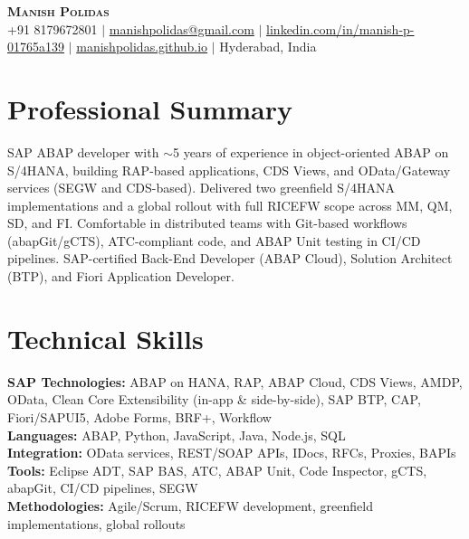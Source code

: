 \documentclass[letterpaper,11pt]{article}
\begin{document}
\begin{center}
    \textbf{\Huge \scshape Manish Polidas} \\ \vspace{1pt}
    \small +91 8179672801 $|$ \href{mailto:manishpolidas@gmail.com}{manishpolidas@gmail.com} $|$
    \href{https://www.linkedin.com/in/manish-p-01765a139/}{linkedin.com/in/manish-p-01765a139} $|$
    \href{https://manishpolidas.github.io}{manishpolidas.github.io} $|$ Hyderabad, India
\end{center}

\section{Professional Summary}
SAP ABAP developer with $\sim$5 years of experience in object-oriented ABAP on S/4HANA, building RAP-based applications, CDS Views, and OData/Gateway services (SEGW and CDS-based). Delivered two greenfield S/4HANA implementations and a global rollout with full RICEFW scope across MM, QM, SD, and FI. Comfortable in distributed teams with Git-based workflows (abapGit/gCTS), ATC-compliant code, and ABAP Unit testing in CI/CD pipelines. SAP-certified Back-End Developer (ABAP Cloud), Solution Architect (BTP), and Fiori Application Developer.

\section{Technical Skills}
 \begin{itemize}[leftmargin=0.15in, label={}]
    \small{\item{
     \textbf{SAP Technologies:} ABAP on HANA, RAP, ABAP Cloud, CDS Views, AMDP, OData, Clean Core Extensibility (in-app \& side-by-side), SAP BTP, CAP, Fiori/SAPUI5, Adobe Forms, BRF+, Workflow \\
     \textbf{Languages:} ABAP, Python, JavaScript, Java, Node.js, SQL \\
     \textbf{Integration:} OData services, REST/SOAP APIs, IDocs, RFCs, Proxies, BAPIs \\
     \textbf{Tools:} Eclipse ADT, SAP BAS, ATC, ABAP Unit, Code Inspector, gCTS, abapGit, CI/CD pipelines, SEGW \\
     \textbf{Methodologies:} Agile/Scrum, RICEFW development, greenfield implementations, global rollouts \\
    }}
 \end{itemize}
\end{document}
